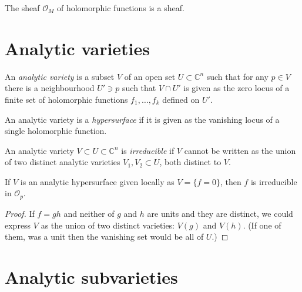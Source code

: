 \begin{lemma}
\label{lemma-holomorphic-function-sheaf}
The sheaf $\mathcal{O}_M$ of holomorphic functions is a sheaf.
\end{lemma}

\section{Analytic varieties}
\label{section-analytic-varieties}

\begin{definition}
\label{definition-analytic-variety}
An {\it analytic variety} is a subset $V$ of an open set $U\subset \mathbb{C}^n$
such that for any $p\in V$ there is a neighbourhood $U'\ni p$ such that $V\cap
U'$ is given as the zero locus of a finite set of holomorphic functions
$f_1,\ldots,f_k$ defined on $U'$.
\end{definition}

\begin{definition}
\label{definition-analytic-hypersurface}
An analytic variety is a {\it hypersurface} if it is given as the vanishing
locus of a single holomorphic function.
\end{definition}

\begin{definition}
\label{definition-irreducible-variety}
An analytic variety $V\subset U\subset \mathbb{C}^n$ is {\it irreducible} if
$V$ cannot be written as the union of two distinct analytic varieties 
$V_1,V_2\subset U$, both distinct to $V$.
\end{definition}

\begin{lemma}
\label{lemma-irreducible-analytic-hypersurface-irreducible-polynomial}
If $V$ is an analytic hypersurface given locally as $V=\{f=0\}$, then $f$ is
irreducible in $\mathcal{O}_p$.
\end{lemma}

\begin{proof}
If $f=gh$ and neither of $g$ and $h$ are units and they are distinct, we could 
express $V$ as the union of two distinct varieties: $V(g)$ and $V(h)$. (If one 
of them, was a unit then the vanishing set would be all of $U$.)
\end{proof}

\section{Analytic subvarieties}
\label{section-analytic-subvarieties}

